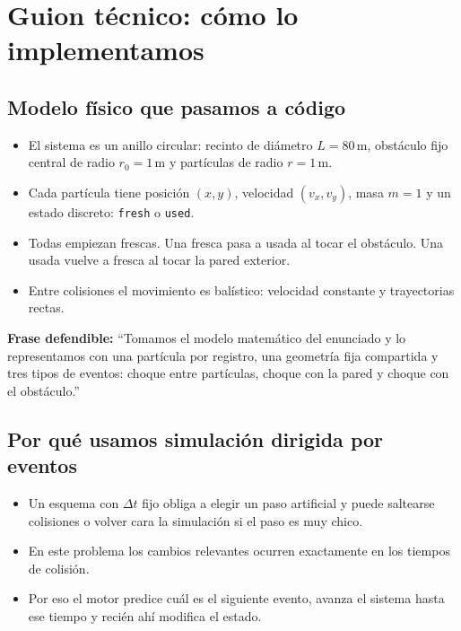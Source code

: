 \documentclass[11pt]{article}
\begin{document}
\section{Guion t\'ecnico: c\'omo lo implementamos}
\label{sec:implementacion}

\subsection{Modelo f\'isico que pasamos a c\'odigo}

\begin{itemize}
  \item El sistema es un anillo circular: recinto de di\'ametro $L=80\,\mathrm{m}$, obst\'aculo fijo central de radio $r_0=1\,\mathrm{m}$ y part\'iculas de radio $r=1\,\mathrm{m}$.
  \item Cada part\'icula tiene posici\'on $(x,y)$, velocidad $(v_x,v_y)$, masa $m=1$ y un estado discreto: \texttt{fresh} o \texttt{used}.
  \item Todas empiezan frescas. Una fresca pasa a usada al tocar el obst\'aculo. Una usada vuelve a fresca al tocar la pared exterior.
  \item Entre colisiones el movimiento es bal\'istico: velocidad constante y trayectorias rectas.
\end{itemize}

\textbf{Frase defendible:} ``Tomamos el modelo matem\'atico del enunciado y lo representamos con una part\'icula por registro, una geometr\'ia fija compartida y tres tipos de eventos: choque entre part\'iculas, choque con la pared y choque con el obst\'aculo.''

\subsection{Por qu\'e usamos simulaci\'on dirigida por eventos}

\begin{itemize}
  \item Un esquema con $\Delta t$ fijo obliga a elegir un paso artificial y puede saltearse colisiones o volver cara la simulaci\'on si el paso es muy chico.
  \item En este problema los cambios relevantes ocurren exactamente en los tiempos de colisi\'on.
  \item Por eso el motor predice cu\'al es el siguiente evento, avanza el sistema hasta ese tiempo y reci\'en ah\'i modifica el estado.
\end{itemize}
\end{document}
